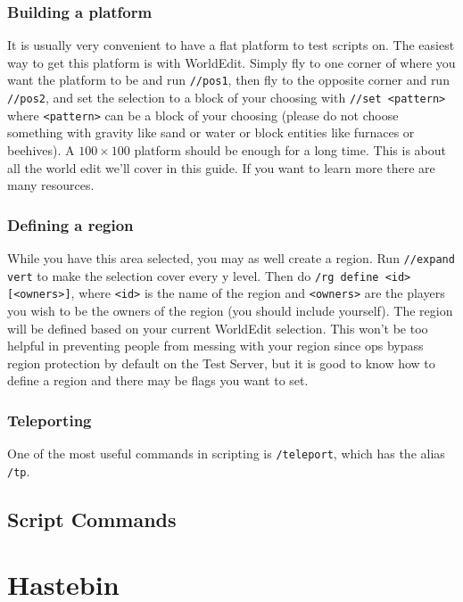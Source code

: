\documentclass[oneside]{book}
\begin{document}
\subsubsection*{Building a platform}

It is usually very convenient to have a flat platform to test scripts on. The easiest way to get this platform is with WorldEdit. Simply fly to one corner of where you want the platform to be and run \texttt{//pos1}, then fly to the opposite corner and run \texttt{//pos2}, and set the selection to a block of your choosing with \texttt{//set <pattern>} where \texttt{<pattern>} can be a block of your choosing (please do not choose something with gravity like sand or water or block entities like furnaces or beehives). A $100 \times 100$ platform should be enough for a long time. This is about all the world edit we'll cover in this guide. If you want to learn more there are many resources. %

\subsubsection*{Defining a region}

While you have this area selected, you may as well create a region. Run \texttt{//expand vert} to make the selection cover every y level. Then do \texttt{/rg define <id> [<owners>]}, where \texttt{<id>} is the name of the region and \texttt{<owners>} are the players you wish to be the owners of the region (you should include yourself). The region will be defined based on your current WorldEdit selection. This won't be too helpful in preventing people from messing with your region since ops bypass region protection by default on the Test Server, but it is good to know how to define a region and there may be flags you want to set.

\subsubsection*{Teleporting}

One of the most useful commands in scripting is \texttt{/teleport}, which has the alias \texttt{/tp}.

\subsection{Script Commands}

\section{Hastebin}
\blindtext
\end{document}
